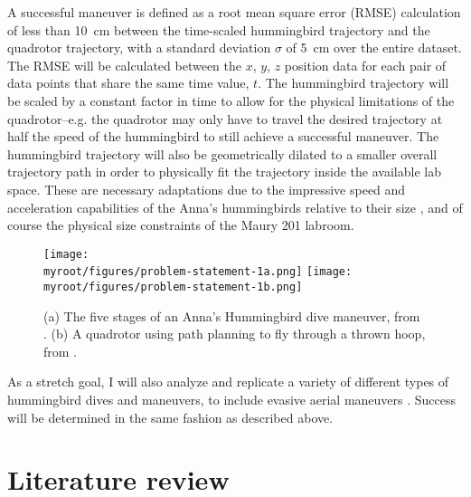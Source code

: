 \documentclass[onecolumn,10pt]{IEEEtran}
\newcommand{\myroot}{../}
\begin{document}
A successful maneuver is defined as a root mean square error (RMSE) calculation of less than \SI{10}{cm} between the time-scaled hummingbird trajectory and the quadrotor trajectory, with a standard deviation $\sigma$ of \SI{5}{cm} over the entire dataset. The RMSE will be calculated between the $x$, $y$, $z$ position data for each pair of data points that share the same time value, $t$. The hummingbird trajectory will be scaled by a constant factor in time to allow for the physical limitations of the quadrotor--e.g. the quadrotor may only have to travel the desired trajectory at half the speed of the hummingbird to still achieve a successful maneuver. The hummingbird trajectory will also be geometrically dilated to a smaller overall trajectory path in order to physically fit the trajectory inside the available lab space. These are necessary adaptations due to the impressive speed and acceleration capabilities of the Anna’s hummingbirds relative to their size \cite{clark2009courtship}, and of course the physical size constraints of the Maury 201 labroom. 
\begin{figure}[h]
\begin{center}
\texttt{[image: \\myroot/figures/problem-statement-1a.png]}%
\texttt{[image: \\myroot/figures/problem-statement-1b.png]}
\end{center}
\caption{(a) The five stages of an Anna’s Hummingbird dive maneuver, from \cite{clark2009courtship}. (b) A quadrotor using path planning to fly through a thrown hoop, from \cite{mellinger2011minimum}.}
\label{fig:problem-statement-1}
\end{figure}

As a stretch goal, I will also analyze and replicate a variety of different types of hummingbird dives and maneuvers, to include evasive aerial maneuvers \cite{sholtis2015field, cheng2016flight}. Success will be determined in the same fashion as described above.





\section{Literature review}
\end{document}
